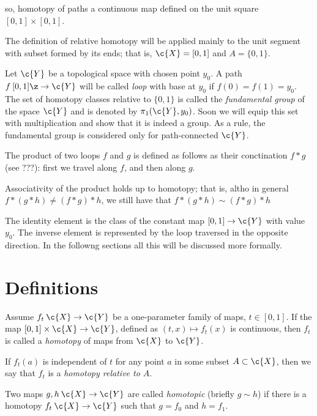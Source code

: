 so, homotopy of paths a continuous map defined on the unit square $[0,1]\times [0,1]$.


The definition of relative homotopy will be applied mainly to the unit segment with subset formed by its ends;
that is, $\c{X}=[0,1]$ and $A=\{0,1\}$.

Let $\c{Y}$ be a topological space with chosen point $y_0$.
A path $f\:[0,1]\z\to \c{Y}$ will be called \emph{loop} with base at $y_0$ if $f(0)=f(1)=y_0$.
The set of homotopy classes relative to $\{0,1\}$ is called the \emph{fundamental group} of the space $\c{Y}$ and is denoted by
$\pi_1(\c{Y},y_0)$.
Soon we will equip this set with multiplication and show that it is indeed a group.
As a rule, the fundamental group is considered only for path-connected $\c{Y}$.

The product of two loops $f$ and $g$ is defined as follows as their conctination $f*g$ (see ???): first we travel along $f$, and then along $g$.

Associativity of the product holds up to homotopy; that is, altho in general $f*(g*h)\ne (f*g)*h$, we still have that $f*(g*h)\sim (f*g)*h$

The identity element is the class of the constant map $[0,1]\to \c{Y}$ with value $y_0$.
The inverse element is represented by the loop traversed in the opposite direction.
In the followng sections all this will be discussed more formally.













\section{Definitions}

Assume $f_t\:\c{X}\to \c{Y}$ be a one-parameter family of maps, $t\in [0,1]$.
If the map $[0,1]\times \c{X}\to \c{Y}$, defined as $(t,x)\mapsto f_t(x)$ is continuous, then $f_t$ is called a \emph{homotopy} of maps from $\c{X}$ to $\c{Y}$.

If $f_t(a)$ is independent of $t$ for any point $a$ in some subset $A\subset \c{X}$, then we say that  $f_t$ is a {}\emph{homotopy relative to $A$}.

Two maps $g,h\:\c{X}\to \c{Y}$ are called {}\emph{homotopic} (briefly $g\sim h$)
if there is a homotopy $f_t\:\c{X}\to \c{Y}$ such that $g=f_0$ and $h=f_1$.

